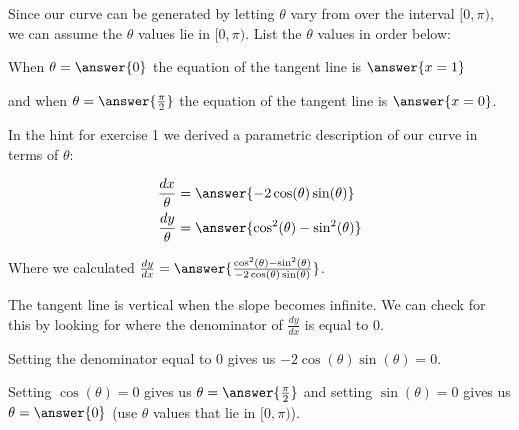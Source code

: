 \documentclass{ximera}
\begin{document}
\begin{exercise}
\begin{exercise}
Since our curve can be generated by letting $\theta$ vary from over the interval $[0, \pi)$, we can assume the $\theta$ values lie in $[0, \pi)$. List the $\theta$ values in order below: 

When $\theta=\answer{0}$ the equation of the tangent line is $\answer{x=1 }$ 

and when $\theta=\answer{ \frac{\pi}{2}}$ the equation of the tangent line is $\answer{x=0}$. 





\begin{hint}


In the hint for exercise 1 we derived a parametric description of our curve in terms of $\theta$: 

\begin{align*}
\frac{dx}{\theta}&=\answer{ -2\cos(\theta)\sin(\theta)  } \\
\frac{dy}{\theta}&=\answer{ \cos^2(\theta)-\sin^2(\theta)    }
\end{align*} 

Where we calculated $\frac{dy}{dx}=\answer{ \frac{ \cos^2(\theta)-\sin^2(\theta)}{-2\cos(\theta)\sin(\theta)}}$. 

The tangent line is vertical when the slope becomes infinite. We can check for this by looking for where the denominator of $\frac{dy}{dx}$ is equal to $0$.

Setting the denominator equal to $0$ gives us $-2\cos(\theta)\sin(\theta)=0$. 

Setting $\cos(\theta)=0$ gives us $\theta=\answer{ \frac{\pi}{2}}$ and setting $\sin(\theta)=0$ gives us 
$\theta=\answer{ 0}$ (use $\theta$ values that lie in $[0, \pi)$). 



\end{hint}

\end{exercise}
\end{exercise}
\end{document}
